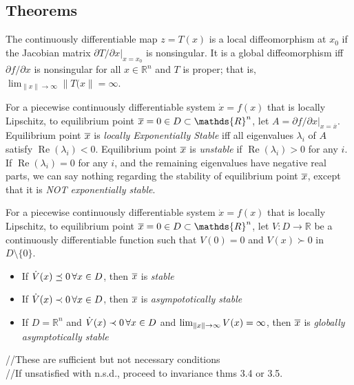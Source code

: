\documentclass[twocolumn]{article}    %
\begin{document}
\subsection*{Theorems}
\begin{lemma}[1.4, pg 19]
    The continuously differentiable map \(z = T(x)\) is a local diffeomorphism at \(x_0\) if the Jacobian matrix \(\partial T/ \partial x |_{x = x_0}\) is nonsingular. It is a global diffeomorphism iff \(\partial f/ \partial x\) is nonsingular for all \(x \in \mathds{R}^n\) and \(T\) is proper; that is, \(\lim_{\|x\| \to \infty} \|T(x\| =\infty\).
\end{lemma}

\begin{remark}[3.2 Linearization, pg 56]
    For a piecewise continuously differentiable system \(\dot{x} = f(x)\) that is locally Lipschitz, to equilibrium point \( \eqpt = 0 \in D \subset \mathds{R}^n\), let \(A = \partial f/ \partial x |_{x=\overline{x}}\). Equilibrium point \(\overline{x}\) is \emph{locally  Exponentially Stable} iff all eigenvalues \(\lambda_i\) of \(A\) satisfy \(\operatorname{Re}(\lambda_i) < 0\). Equilibrium point \(\overline{x}\) is 
    \emph{unstable} if \(\operatorname{Re}(\lambda_i) > 0\) for any \(i\). If \(\operatorname{Re}(\lambda_i) = 0\) for any \(i\), and the remaining eigenvalues have negative real parts, we can say nothing regarding the stability of equilibrium point \(\overline{x}\), except that it is \emph{NOT exponentially stable}.
\end{remark}


\begin{remark}[3.3 Lyapunov, pg 59]
    For a piecewise continuously differentiable system \(\dot{x} = f(x)\) that is locally Lipschitz, to equilibrium point \( \eqpt = 0 \in D \subset \mathds{R}^n\), let \(V:D \to \mathds{R}\) be a continuously differentiable function such that \(V(0) = 0\) and \(V(x) \succ 0\) in \(D\setminus\{0\}\).
    \begin{itemize}
        \item If \(\dot{V}(x) \preceq 0 \, \forall x \in D\), then \(\overline{x}\) is \emph{stable}
        \item If \(\dot{V}(x) \prec 0 \, \forall x \in D\), then \(\overline{x}\) is \emph{asympototically stable}
        \item If \(D =\mathds{R}^n\) and \(\dot{V}(x) \prec 0\, \forall x \in D\) and \(\lim_{\|x\|\to\infty} V(x) = \infty\), then \(\overline{x}\) is \emph{globally asymptotically stable}
    \end{itemize}
    //These are sufficient but not necessary conditions\\
    //If unsatisfied with n.s.d., proceed to invariance thms 3.4 or 3.5.
\end{remark}
\end{document}
